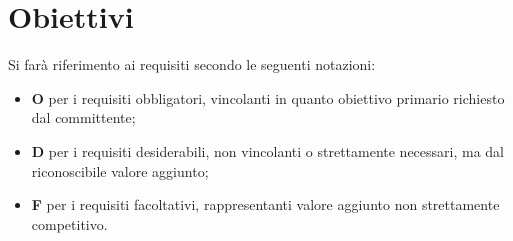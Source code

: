 \section{Obiettivi}

Si farà riferimento ai requisiti secondo le seguenti notazioni:
\begin{itemize}
    \item \textbf{O} per i requisiti obbligatori, vincolanti in quanto obiettivo primario richiesto dal committente;
    \item \textbf{D} per i requisiti desiderabili, non vincolanti o strettamente necessari, ma dal riconoscibile valore aggiunto;
    \item \textbf{F} per i requisiti facoltativi, rappresentanti valore aggiunto non strettamente competitivo.
\end{itemize}

